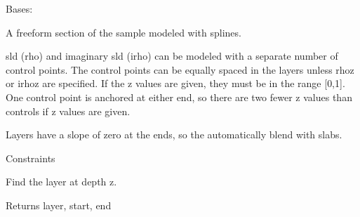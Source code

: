 \documentclass[letterpaper,10pt,english]{sphinxmanual}
\begin{document}

\begin{fulllineitems}
\label{api/mono:refl1d.mono.FreeLayer}
Bases: {\hyperref[api/model:refl1d.model.Layer]{}}

A freeform section of the sample modeled with splines.

sld (rho) and imaginary sld (irho) can be modeled with a separate
number of control points. The control points can be equally spaced
in the layers unless rhoz or irhoz are specified. If the z values
are given, they must be in the range {[}0,1{]}.  One control point is
anchored at either end, so there are two fewer z values than controls
if z values are given.

Layers have a slope of zero at the ends, so the automatically blend
with slabs.

\begin{fulllineitems}
\label{api/mono:refl1d.mono.FreeLayer.constraints}
Constraints

\end{fulllineitems}


\begin{fulllineitems}
\label{api/mono:refl1d.mono.FreeLayer.find}
Find the layer at depth z.

Returns layer, start, end

\end{fulllineitems}


\begin{fulllineitems}
\label{api/mono:refl1d.mono.FreeLayer.parameters}
\end{fulllineitems}


\begin{fulllineitems}
\label{api/mono:refl1d.mono.FreeLayer.profile}
\end{fulllineitems}


\begin{fulllineitems}
\label{api/mono:refl1d.mono.FreeLayer.render}
\end{fulllineitems}


\end{fulllineitems}
\end{document}
